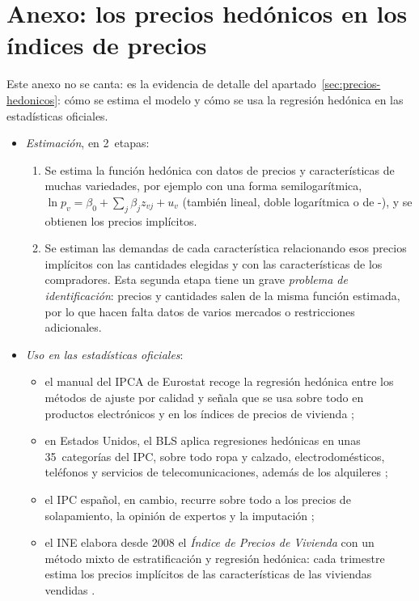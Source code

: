 \documentclass[11pt]{article}
\begin{document}
\section{Anexo: los precios hedónicos en los índices de precios}\label{anexo:hedonicos}

\begin{notaopositor}
Este anexo no se canta: es la evidencia de detalle del apartado~\ref{sec:precios-hedonicos}: cómo se estima el modelo y cómo se usa la regresión hedónica en las estadísticas oficiales.
\end{notaopositor}

\begin{itemize}
\item \emph{Estimación}, en 2~etapas:
  \begin{enumerate}
  \item Se estima la función hedónica con datos de precios y características de muchas variedades, por ejemplo con una forma semilogarítmica, $\ln p_v=\beta_0+\sum_j\beta_j z_{vj}+u_v$ (también lineal, doble logarítmica o de -), y se obtienen los precios implícitos.
  \item Se estiman las demandas de cada característica relacionando esos precios implícitos con las cantidades elegidas y con las características de los compradores. Esta segunda etapa tiene un grave \emph{problema de identificación}: precios y cantidades salen de la misma función estimada, por lo que hacen falta datos de varios mercados o restricciones adicionales\nocite{EkelandHeckmanNesheim2004}.
  \end{enumerate}
\end{itemize}

\begin{itemize}
\item \emph{Uso en las estadísticas oficiales}:
  \begin{itemize}
  \item el manual del IPCA de Eurostat recoge la regresión hedónica entre los métodos de ajuste por calidad y señala que se usa sobre todo en productos electrónicos y en los índices de precios de vivienda \parencite{Eurostat2024HICPManual,Triplett2006Handbook};
  \item en Estados Unidos, el BLS aplica regresiones hedónicas en unas 35~categorías del IPC, sobre todo ropa y calzado, electrodomésticos, teléfonos y servicios de telecomunicaciones, además de los alquileres \parencite{BLS2026QualityAdjustment};
  \item el IPC español, en cambio, recurre sobre todo a los precios de solapamiento, la opinión de expertos y la imputación \parencite{INE2026IPCMetodologia} ;
  \item el INE elabora desde 2008 el \emph{Índice de Precios de Vivienda} con un método mixto de estratificación y regresión hedónica: cada trimestre estima los precios implícitos de las características de las viviendas vendidas \parencite{INE2026IPVMetodologia} .
  \end{itemize}
\end{itemize}
\end{document}
